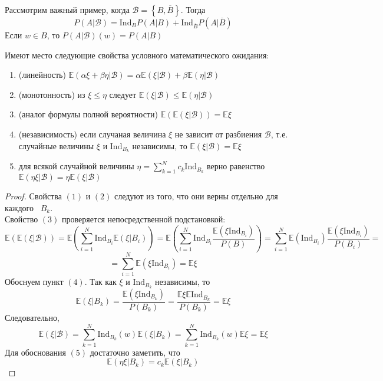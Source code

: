 \begin{example}
Рассмотрим важный пример, когда $\mathcal{B} = \left\{ B, \overline{B}\right\}$. Тогда 
\[
    P\left(A | \mathcal{B}\right) = \text{Ind}_{B} P\left(A | B\right) + \text{Ind}_{\overline{B}}P\left(A | \overline{B}\right)
\]
Если $w \in B$, то $P\left(A | \mathcal{B}\right)\left(w\right) = P\left(A | B\right)$
\end{example}

\begin{theorem}
Имеют место следующие свойства условного математического ожидания:
\begin{enumerate}[label=(\arabic*)]
\item (линейность) $\mathbb{E}\left(\alpha \xi + \beta \eta | \mathcal{B}\right) = \alpha \mathbb{E}\left(\xi | \mathcal{B}\right) + \beta \mathbb{E}\left(\eta | \mathcal{B}\right)$
\item (монотонность) из $\xi \leq \eta$ следует $\mathbb{E}\left(\xi | \mathcal{B}\right) \leq \mathbb{E}\left(\eta | \mathcal{B}\right)$
\item (аналог формулы полной вероятности) $\mathbb{E}\left(\mathbb{E}\left(\xi | \mathcal{B}\right)\right) = \mathbb{E}\xi$
\item (независимость) если случаная величина $\xi$ не зависит от разбиения $\mathcal{B}$, т.е. случайные величины $\xi$ и $\text{Ind}_{B_k}$ независимы, то $\mathbb{E}\left(\xi | \mathcal{B}\right) = \mathbb{E} \xi$
\item для всякой случайной величины $\eta = \sum_{k = 1}^{N} c_k \text{Ind}_{B_k}$ верно равенство
$\mathbb{E}\left(\eta \xi | \mathcal{B}\right) = \eta \mathbb{E}\left(\xi | \mathcal{B}\right)$

\end{enumerate}
\end{theorem}
\begin{proof}
Свойства $(1)$ и $(2)$ следуют из того, что они верны отдельно для каждого  $B_k$. \\ 
Свойство $(3)$ проверяется непосредственной подстановкой: 
\[
    \mathbb{E}\left(\mathbb{E}\left(\xi | \mathcal{B}\right)\right) = \mathbb{E} \left(\sum_{i = 1}^{N} \text{Ind}_{B_{i}} \mathbb{E}\left(\xi | B_i\right)\right)
    = \mathbb{E} \left(\sum_{i = 1}^{N} \text{Ind}_{B_{i}} \frac{\mathbb{E}\left(\xi \text{Ind}_{B_i}\right)}{P\left(B\right)}\right) = \sum_{i = 1}^{N} \mathbb{E}\left(\text{Ind}_{B_i}\right) \frac{\mathbb{E}\left(\xi \text{Ind}_{B_i}\right)}{P\left(B_i\right)} = \]
    \[
    =\sum_{i = 1}^{N} \mathbb{E}\left(\xi \text{Ind}_{B_i}\right) = \mathbb{E} \xi
\]
Обоснуем пункт $(4)$. Так как $\xi$ и $\text{Ind}_{B_k}$ независимы, то 
\[
    \mathbb{E}\left(\xi | B_k\right) = \frac{\mathbb{E}\left(\xi \text{Ind}_{B_k}\right)}{P\left(B_k\right)} = \frac{\mathbb{E}\xi \mathbb{E} \text{Ind}_{B_k}}{P\left(B_k\right)} = \mathbb{E}\xi
\]
Следовательно,
\[
    \mathbb{E}\left(\xi | \mathcal{B}\right) = \sum_{k = 1}^{N} \text{Ind}_{B_k}\left(w\right) \mathbb{E} \left(\xi | B_k\right) = \sum_{k = 1}^{N} \text{Ind}_{B_k}\left(w\right) \mathbb{E} \xi = \mathbb{E} \xi
\]
Для обоснования $(5)$ достаточно заметить, что
\[
    \mathbb{E}\left(\eta \xi | B_k\right) = c_k \mathbb{E}\left(\xi | B_k\right)
\]
\end{proof}

